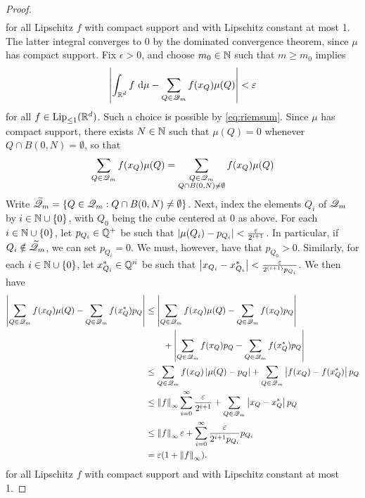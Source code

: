\begin{proof}
\begin{equation}
\begin{aligned}
        \end{aligned}
    \end{equation}
    for all Lipschitz $f$ with compact support and with Lipschitz constant at most 1. The latter integral converges to 0 by the dominated convergence theorem, since $\mu$ has compact support.
    Fix $\epsilon > 0$, and choose $m_0 \in \mathbb{N}$ such that $m \geq m_0$ implies 
    \begin{equation} \label{m0definition}
        \left\vert { \int_{\mathbb{R}^d} f \, \ensuremath{\operatorname{d}\!{\mu}} - \sum_{Q \in \mathscr{Q}_m} f(x_Q)\mu(Q) } \right\vert < \varepsilon
    \end{equation}
    for all $f \in \operatorname{Lip}_{\leq 1}(\mathbb{R}^d)$. Such a choice is possible by \eqref{eq:riemsum}.
    Since $\mu$ has compact support, there exists $N \in \mathbb{N}$ such that $\mu(Q) = 0$ whenever $Q \cap B(0,N) = \emptyset$, so that 
    \begin{equation} 
        \sum_{Q \in \mathscr{Q}_m} f(x_Q)\mu(Q) = \sum_{\substack{Q \in \mathscr{Q}_m \\ Q \cap B(0,N) \neq \emptyset}} f(x_Q)\mu(Q)
    \end{equation}
    Write $\widetilde{\mathscr{Q}}_m = \{ Q \in \mathscr{Q}_m : Q \cap B(0,N) \neq \emptyset \}$.
    Next, index the elements $Q_i$ of $\mathscr{Q}_m$ by $i \in \mathbb{N} \cup \{0\}$, with $Q_0$ being the cube centered at 0 as above. For each $i \in \mathbb{N} \cup \{0\}$, let $p_{Q_i} \in \mathbb{Q}^+$ be such that $\left\vert { \mu(Q_i) - p_{Q_i} } \right\vert < \frac{\varepsilon}{2^{i+1}}$. In particular, if $Q_i \notin \widetilde{\mathscr{Q}}_m$, we can set $p_{Q_i} = 0$. We must, however, have that $p_{Q_0} > 0$. Similarly, for each $i \in \mathbb{N} \cup \{0\}$, let $x_{Q_i}^* \in \mathbb{Q}^n$ be such that $\left\vert { x_{Q_i} - x_{Q_i}^* } \right\vert < \frac{\varepsilon}{2^{(i+1)} p_{Q_i} }$. We then have
    \begin{equation}
        \begin{aligned}
            \left\vert { \sum_{Q \in \mathscr{Q}_m} f(x_Q)\mu(Q) - \sum_{Q \in \mathscr{Q}_m} f(x_Q^*)p_Q } \right\vert
            &\leq \left\vert { \sum_{Q \in \mathscr{Q}_m} f(x_Q)\mu(Q) - \sum_{Q \in \mathscr{Q}_m} f(x_Q)p_Q } \right\vert\\
            &\hspace{20pt} + \left\vert { \sum_{Q \in \mathscr{Q}_m} f(x_Q)p_Q - \sum_{Q \in \mathscr{Q}_m} f(x_Q^*)p_Q } \right\vert \\
            &\leq \sum_{Q \in \mathscr{Q}_m} f(x_Q) \left\vert { \mu(Q) - p_Q } \right\vert
                + \sum_{Q \in \mathscr{Q}_m} \left\vert { f(x_Q) - f(x_Q^*) } \right\vert p_Q \\
            &\leq \left\Vert {f} \right\Vert_\infty \sum_{i=0}^\infty \frac{\varepsilon}{2^{i+1}}
                + \sum_{Q \in \mathscr{Q}_m} \left\vert { x_Q - x_Q^* } \right\vert p_Q \\
            &\leq \left\Vert {f} \right\Vert_\infty \varepsilon + \sum_{i=0}^\infty \frac{\varepsilon}{2^{i+1} p_{Q_i}} p_{Q_i} \\
            &= \varepsilon(1 + \left\Vert {f} \right\Vert_\infty).
            \end{aligned}
    \end{equation}
    for all Lipschitz $f$ with compact support and with Lipschitz constant at most 1. 
    

\end{proof}
